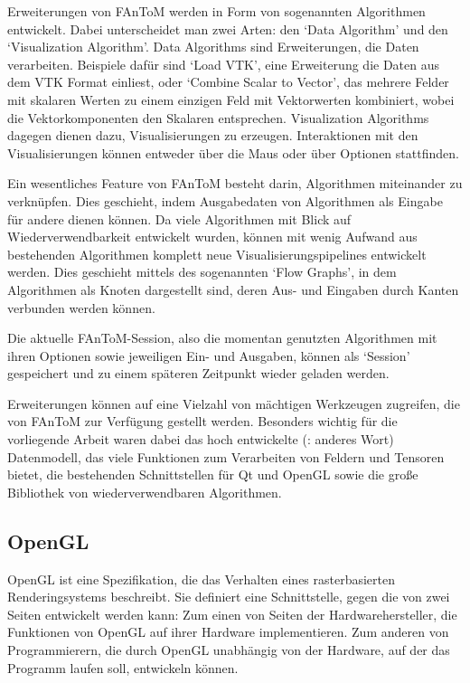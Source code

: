 \documentclass[a4paper,fontsize=12pt,toc=bib,halfparskip]{scrartcl}
\begin{document}
Erweiterungen von FAnToM werden in Form von sogenannten Algorithmen entwickelt. Dabei unterscheidet man zwei Arten: den `Data Algorithm' und den `Visualization Algorithm'. Data Algorithms sind Erweiterungen, die Daten verarbeiten. Beispiele daf\"ur sind `Load VTK', eine Erweiterung die Daten aus dem VTK Format einliest, oder `Combine Scalar to Vector', das mehrere Felder mit skalaren Werten zu einem einzigen Feld mit Vektorwerten kombiniert, wobei die Vektorkomponenten den Skalaren entsprechen.
Visualization Algorithms dagegen dienen dazu, Visualisierungen zu erzeugen. Interaktionen mit den Visualisierungen k\"onnen entweder \"uber die Maus oder \"uber Optionen stattfinden.

Ein wesentliches Feature von FAnToM besteht darin, Algorithmen miteinander zu verkn\"upfen. Dies geschieht, indem Ausgabedaten von Algorithmen als Eingabe f\"ur andere dienen k\"onnen. Da viele Algorithmen mit Blick auf Wiederverwendbarkeit entwickelt wurden, k\"onnen mit wenig Aufwand aus bestehenden Algorithmen komplett neue Visualisierungspipelines entwickelt werden. Dies geschieht mittels des sogenannten `Flow Graphs', in dem Algorithmen als Knoten dargestellt sind, deren Aus- und Eingaben durch Kanten verbunden werden k\"onnen.

Die aktuelle FAnToM-Session, also die momentan genutzten Algorithmen mit ihren Optionen sowie jeweiligen Ein- und Ausgaben, k\"onnen als `Session' gespeichert und zu einem sp\"ateren Zeitpunkt wieder geladen werden.

Erweiterungen k\"onnen auf eine Vielzahl von m\"achtigen Werkzeugen zugreifen, die von FAnToM zur Verf\"ugung gestellt werden. Besonders wichtig f\"ur die vorliegende Arbeit waren dabei das hoch entwickelte (: anderes Wort) Datenmodell, das viele Funktionen zum Verarbeiten von Feldern und Tensoren bietet, die bestehenden Schnittstellen f\"ur Qt und OpenGL sowie die gro{\ss}e Bibliothek von wiederverwendbaren Algorithmen.
\subsection{OpenGL}
\label{sec:OpenGL}
OpenGL\cite{openglWebsite} ist eine Spezifikation, die das Verhalten eines rasterbasierten Renderingsystems beschreibt. Sie definiert eine Schnittstelle, gegen die von zwei Seiten entwickelt werden kann: Zum einen von Seiten der Hardwarehersteller, die Funktionen von OpenGL auf ihrer Hardware implementieren. Zum anderen von Programmierern, die durch OpenGL unabh\"angig von der Hardware, auf der das Programm laufen soll, entwickeln k\"onnen. 
\end{document}
